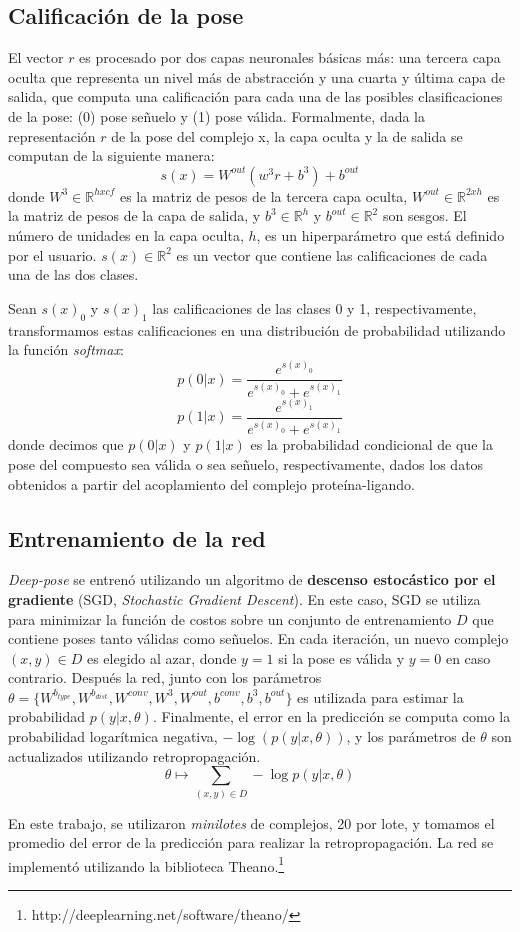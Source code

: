\subsection{Calificación de la pose}
El vector $r$ es procesado por dos capas neuronales básicas más: una
tercera capa oculta que representa un nivel más de abstracción y una
cuarta y última capa de salida, que computa una calificación para cada
una de las posibles clasificaciones de la pose: (0) pose señuelo y (1)
pose válida. Formalmente, dada la representación $r$ de la pose del
complejo x, la capa oculta y la de salida se computan de la siguiente
manera:
\begin{equation}
  s(x) = W^{out}(w^3r + b^3) + b^{out}
\end{equation}
donde $W^3 \in \mathbb{R}^{hxcf}$ es la matriz de pesos de la tercera
capa oculta, $W^{out} \in \mathbb{R}^{2xh}$ es la matriz de pesos de la
capa de salida, y $b^3 \in \mathbb{R}^h$ y $b^{out} \in \mathbb{R}^2$ son
sesgos. El número de unidades en la capa oculta, $h$, es un hiperparámetro
que está definido por el usuario. $s(x) \in \mathbb{R}^2$ es un vector
que contiene las calificaciones de cada una de las dos clases.

Sean $s(x)_0$ y $s(x)_1$ las calificaciones de las clases 0 y 1,
respectivamente, transformamos estas calificaciones en una
distribución de probabilidad utilizando la función \textit{softmax}:
\begin{equation}
  p(0|x) = \frac{e^{s(x)_0}}{e^{s(x)_0}+e^{s(x)_1}}
\end{equation}
\begin{equation}
  p(1|x) = \frac{e^{s(x)_1}}{e^{s(x)_0}+e^{s(x)_1}}
\end{equation}
donde decimos que $p(0|x)$ y $p(1|x)$ es la probabilidad condicional
de que la pose del compuesto sea válida o sea señuelo,
respectivamente, dados los datos obtenidos a partir del acoplamiento
del complejo proteína-ligando.

\subsection{Entrenamiento de la red}
\textit{Deep-pose} se entrenó utilizando un algoritmo de
\textbf{descenso estocástico por el gradiente}
(SGD, \textit{Stochastic Gradient Descent}).
En este caso, SGD se utiliza para minimizar la función de costos sobre
un conjunto de entrenamiento $D$ que contiene poses tanto válidas como
señuelos. En cada iteración, un nuevo complejo $(x,y) \in D$ es
elegido al azar, donde $y=1$ si la pose es válida y $y=0$ en caso
contrario. Después la red, junto con los parámetros $\theta
= \{W^{b_{type}}, W^{b_{dist}}, W^{conv}, W^3, W^{out}, b^{conv},
b^{3}, b^{out}\}$ es utilizada para estimar la probabilidad
$p(y|x, \theta)$. Finalmente, el error en la predicción se computa
como la probabilidad logarítmica negativa, $-\log(p(y|x, \theta))$, y
los parámetros de $\theta$ son actualizados
utilizando retropropagación.
\begin{equation}
  \theta \longmapsto \sum_{(x,y) \in D} -\log p(y|x, \theta)
\end{equation}

En este trabajo, se utilizaron \textit{minilotes} de complejos, 20 por
lote, y tomamos el promedio del error de la predicción para realizar
la retropropagación. La red se implementó utilizando la biblioteca
Theano.\footnote{http://deeplearning.net/software/theano/}
